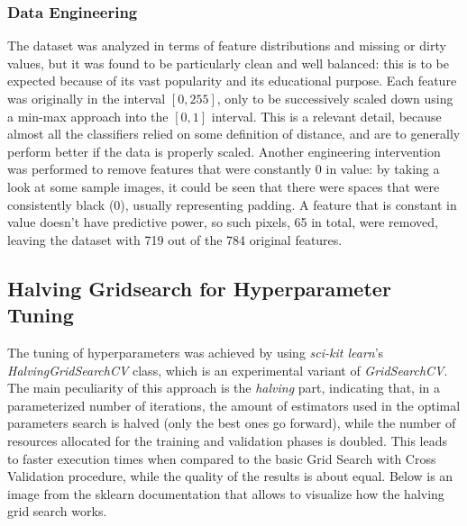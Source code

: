 \subsubsection{Data Engineering}

The dataset was analyzed in terms of feature distributions and missing or dirty values, but it was found to be particularly clean and well balanced: this is to be expected because of its vast popularity and its educational purpose.
Each feature was originally in the interval $[0, 255]$, only to be successively scaled down using a min-max approach into the $[0, 1]$ interval. This is a relevant detail, because almost all the classifiers relied on some definition of distance, and are to generally perform better if the data is properly scaled.
Another engineering intervention was performed to remove features that were constantly 0 in value: by taking a look at some sample images, it could be seen that there were spaces that were consistently black (0), usually representing padding. A feature that is constant in value doesn't have predictive power, so such pixels, 65 in total, were removed, leaving the dataset with 719 out of the 784 original features.

\subsection{Halving Gridsearch for Hyperparameter Tuning}

The tuning of hyperparameters was achieved by using \textit{sci-kit learn}'s \textit{HalvingGridSearchCV} class, which is an experimental variant of \textit{GridSearchCV}. The main peculiarity of this approach is the \textit{halving} part, indicating that, in a parameterized number of iterations, the amount of estimators used in the optimal parameters search is halved (only the best ones go forward), while the number of resources allocated for the training and validation phases is doubled. This leads to faster execution times when compared to the basic Grid Search with Cross Validation procedure, while the quality of the results is about equal.
Below is an image from the sklearn documentation that allows to visualize how the halving grid search works.

